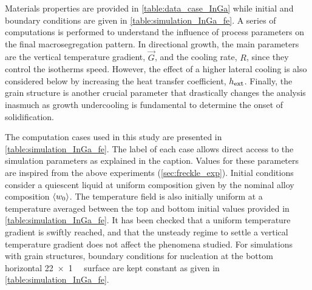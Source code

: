 \begin{table}[htbp]
\centering
\caption{Summary of the simulations and and the corresponding parameters for the FE cases, where a purely macroscopic model is used.
Parameters are varied from (G1) low to (G2) high gradient and (L0) no, to (L1) low lateral cooling.}
\label{table:simulation_InGa_fe}
\end{table}


Materials properties are provided in \cref{table:data_case_InGa} while initial and boundary conditions are given in \cref{table:simulation_InGa_fe}. 
A series of computations is performed to understand the influence of process parameters on the final macrosegregation pattern. 
In directional growth, the main parameters are the vertical temperature gradient, $\vec{G}$, and the cooling rate, $R$, since they control the isotherms 
speed. However, the effect of a higher lateral cooling is also considered below by increasing the heat transfer coefficient,
$h_{\text{ext}}$. Finally, the grain structure is another crucial parameter that drastically changes the analysis inasmuch as growth 
undercooling is fundamental to determine the onset of solidification. 

The computation cases used in this study are presented 
in \cref{table:simulation_InGa_fe}. The label of each case allows direct access to the simulation parameters as explained in the caption. Values for 
these parameters are inspired from the above experiments (\cref{sec:freckle_exp}). Initial conditions consider a quiescent 
liquid at uniform composition given by the nominal alloy composition $\left \langle {w}_0 \right \rangle$. The temperature field is also initially uniform 
at a temperature averaged between the top and bottom initial values provided in \cref{table:simulation_InGa_fe}. It has been checked that a uniform 
temperature gradient is swiftly reached, and that the unsteady regime to settle a vertical temperature gradient does not affect 
the phenomena studied. For simulations with grain structures, boundary conditions for nucleation at the bottom horizontal \SI{22 x 1}{\milli \uarea} 
surface are kept constant as given in \cref{table:simulation_InGa_fe}.

